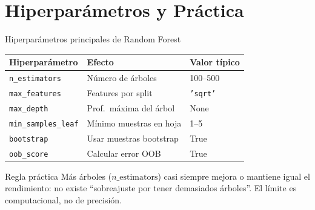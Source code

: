 \documentclass[aspectratio=169]{beamer}
\begin{document}
\section{Hiperparámetros y Práctica}

\begin{frame}{Hiperparámetros principales de Random Forest}
  \begin{center}
  \begin{tabular}{lll}
    \toprule
    \textbf{Hiperparámetro} & \textbf{Efecto} & \textbf{Valor típico} \\
    \midrule
    \texttt{n\_estimators}   & Número de árboles            & 100--500 \\
    \texttt{max\_features}   & Features por split           & \texttt{'sqrt'} \\
    \texttt{max\_depth}      & Prof.\ máxima del árbol      & None \\
    \texttt{min\_samples\_leaf} & Mínimo muestras en hoja  & 1--5 \\
    \texttt{bootstrap}       & Usar muestras bootstrap      & True \\
    \texttt{oob\_score}      & Calcular error OOB           & True \\
    \bottomrule
  \end{tabular}
  \end{center}

  \medskip
  \begin{block}{Regla práctica}
    Más árboles ($n\_\text{estimators}$) casi siempre mejora o mantiene igual el rendimiento:
    no existe ``sobreajuste por tener demasiados árboles''.
    El límite es computacional, no de precisión.
  \end{block}
\end{frame}
\end{document}
